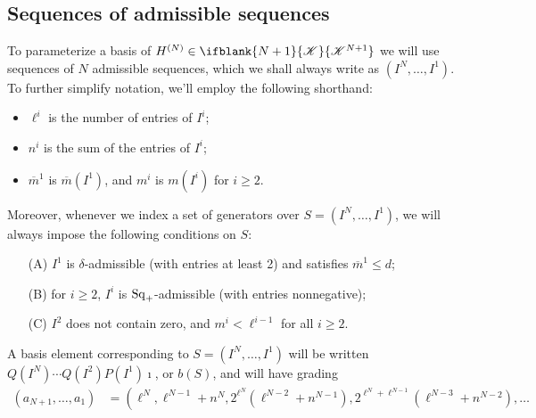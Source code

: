 \documentclass[10pt]{article}
\newcommand{\LL}[1]{\ifblank{#1}{\scrK}{\scrK^{#1}}}
\renewcommand{\Q}{Q}
\newcommand{\SqShift}{\Sq_{\smash{+}}}
\newcommand{\Sq}{\mathrm{Sq}}
\newcommand{\minDim}{m}
\newcommand{\minDimP}{\overline{m}}
\begin{document}
\begin{SequenceOfSequencesIntro}
\subsection{Sequences of admissible sequences}
To parameterize a basis of $H^{(N)}\in\LL{N+1}$ we will use sequences of $N$ admissible sequences, which we shall always write as $(I^N,\ldots,I^1)$. To further simplify notation, we'll employ the following shorthand:
\begin{itemize}
\squishlist
\setlength{\parindent}{.25in}
\item $\ell^i$ is the number of entries of $I^i$;
\item $n^i$ is the sum of the entries of $I^i$;
\item $\minDimP^1$ is $\minDimP(I^1)$, and $\minDim^i$ is $\minDim(I^i)$ for $i\geq2$.
\end{itemize}
Moreover, whenever we index a set of generators over $S=(I^N,\ldots,I^1)$, we will always impose the following conditions on $S$:
\begin{enumerate}[A)]
\squishlist
\setlength{\parindent}{.25in}
\item[\textup{(A)}] $I^1$ is $\delta$-admissible (with entries at least 2) and satisfies $\minDimP^1\leq d$;
\item[\textup{(B)}] for $i\geq2$, $I^i$ is $\SqShift$-admissible (with entries nonnegative);
\item[\textup{(C)}] $I^2$ does not contain zero, and $\minDim^i<\ell^{i-1}$ for all $i\geq2$.
\end{enumerate}
A basis element corresponding to $S=(I^N,\ldots,I^1)$ will be written $\Q(I^N)\cdots \Q(I^2)P(I^1)\imath$, or $b(S)$, and will have grading%
\begin{align*}
 (a_{N+1},\ldots,a_1) &= \left( \ell^N,\ell^{N-1}+n^N,2^{\ell^N}\!\left(\ell^{N-2}+n^{N-1}\right),2^{\ell^N+\ell^{N-1}}\!\left(\ell^{N-3}+n^{N-2}\right),\ldots \right.\\

\end{align*}
\end{SequenceOfSequencesIntro}
\end{document}
